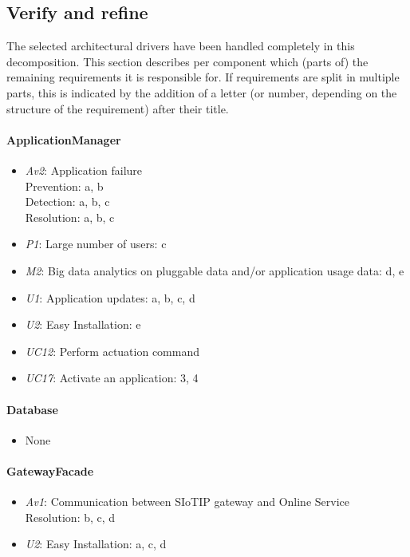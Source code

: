 \subsection{Verify and refine}
    \noindent The selected architectural drivers have been handled completely
    in this decomposition.
    This section describes per component which (parts of) the remaining
    requirements it is responsible for. If requirements are split in
    multiple parts, this is indicated by the addition of a letter
    (or number, depending on the structure of the requirement) after their title.

    \paragraph{ApplicationManager}
        \begin{itemize}
            \item \emph{Av2}: Application failure \\
                   Prevention: a, b \\
                   Detection: a, b, c \\
                   Resolution: a, b, c
           \item \emph{P1}: Large number of users: c
           \item \emph{M2}: Big data analytics on pluggable data and/or application usage data: d, e
           \item \emph{U1}: Application updates: a, b, c, d
           \item \emph{U2}: Easy Installation: e
           \item \emph{UC12}: Perform actuation command
           \item \emph{UC17}: Activate an application: 3, 4
        \end{itemize}

    \paragraph{Database}
        \begin{itemize}
          	\item None
        \end{itemize}

    \paragraph{GatewayFacade}
        \begin{itemize}
            \item \emph{Av1}: Communication between SIoTIP gateway and Online Service \\
                               Resolution: b, c, d
            \item \emph{U2}: Easy Installation: a, c, d
        \end{itemize}


